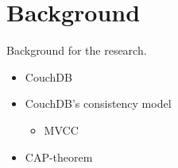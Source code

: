 \section{Background}

Background for the research.\cite{Nobody06}

\begin{itemize}
  \item CouchDB
  \item CouchDB's consistency model
  \begin{itemize}
    \item MVCC
  \end{itemize}
  \item CAP-theorem
\end{itemize}
